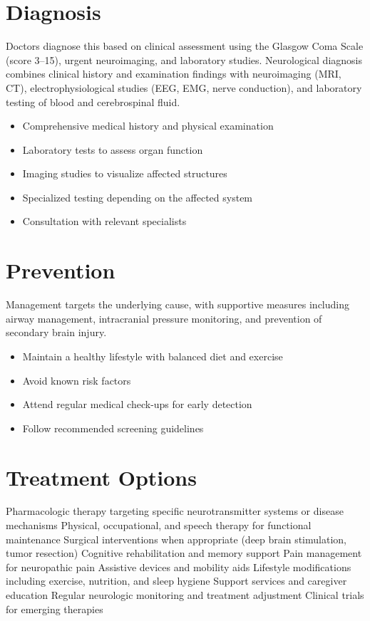 \section{Diagnosis}
Doctors diagnose this based on clinical assessment using the Glasgow Coma Scale (score 3--15), urgent neuroimaging, and laboratory studies. Neurological diagnosis combines clinical history and examination findings with neuroimaging (MRI, CT), electrophysiological studies (EEG, EMG, nerve conduction), and laboratory testing of blood and cerebrospinal fluid.

\begin{itemize}[noitemsep]
  \item Comprehensive medical history and physical examination
  \item Laboratory tests to assess organ function
  \item Imaging studies to visualize affected structures
  \item Specialized testing depending on the affected system
  \item Consultation with relevant specialists
\end{itemize}
\section{Prevention}
Management targets the underlying cause, with supportive measures including airway management, intracranial pressure monitoring, and prevention of secondary brain injury.

\begin{itemize}[noitemsep]
  \item Maintain a healthy lifestyle with balanced diet and exercise
  \item Avoid known risk factors
  \item Attend regular medical check-ups for early detection
  \item Follow recommended screening guidelines
\end{itemize}
\section{Treatment Options}
Pharmacologic therapy targeting specific neurotransmitter systems or disease mechanisms Physical, occupational, and speech therapy for functional maintenance Surgical interventions when appropriate (deep brain stimulation, tumor resection) Cognitive rehabilitation and memory support Pain management for neuropathic pain Assistive devices and mobility aids Lifestyle modifications including exercise, nutrition, and sleep hygiene Support services and caregiver education Regular neurologic monitoring and treatment adjustment Clinical trials for emerging therapies

